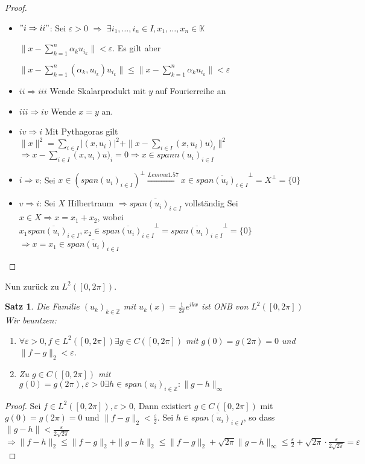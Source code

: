 \documentclass[ngerman]{report}
\theoremstyle{plain}%
\newtheorem{thm}{Satz}[chapter]
\theoremstyle{definition}%
\theoremstyle{myStyle}
\newcommand{\Z}{\mathbb{Z}}
\newcommand{\K}{\mathbb{K}}
\newcommand{\norm}[1]{\|#1\|}
\newcommand{\df}[1][]{%
	\overset{#1}{\Rightarrow}
}
\newcommand{\qmarks}[1]{"#1"}
\newcommand{\ff}[3]{(#1_#2)_{#2\in#3}}
\begin{document}
	\begin{proof}
		\begin{itemize}[]
			\item $\qmarks{i\df ii}$: 
				Sei $\varepsilon > 0$ $\df$ $\exists i_1,\dots,i_n \in I, x_1,\dots,x_n \in \K$\par
					$\norm{x - \sum_{k=1}^n\alpha_k u_{i_k}} < \varepsilon$. Es gilt aber \par
					$\norm{x - \sum_{k=1}^n(\alpha_k ,u_{i_k})u_{i_k}} \leq \norm{x - \sum_{k=1}^n\alpha_k u_{i_k}} < \varepsilon$
			\item $ii\df iii$ Wende Skalarprodukt mit $y$ auf Fourierreihe an
			\item $iii \df iv$ Wende $x=y$ an.
			\item $iv \df i$ Mit Pythagoras gilt 
			 $\norm{x}^2 = \sum_{i\in I}|(x,u_i)|^2 + \norm{x - \sum_{i\in I}(x,u_i) u)_i}^2$
			 $\df x - \sum_{i\in I}(x,u_i) u)_i = 0 \df x\in spann\ff{u}{i}{I}$
			\item $i\df v$: Sei $x\in(span\ff{u}{i}{I})^\perp \df[Lemma 1.57] x\in \overline{span\ff{u}{i}{I}}^\perp = X^\perp = \{0\}$
			\item $v \df i$: Sei $X$ Hilbertraum $\df \overline{span\ff{u}{i}{I}}$ vollständig
			Sei $x\in X \df x = x_1 + x_2$, wobei 
			$x_1 \overline{span\ff{u}{i}{I}}, x_2 \in \overline{span\ff{u}{i}{I}}^\perp = \overline{span\ff{u}{i}{I}}^\perp = \{0\}$
			$\df x = x_1 \in \overline{span\ff{u}{i}{I}}$
		\end{itemize}
	\end{proof}

	Nun zurück zu $L^2([0,2\pi]).$

	\begin{thm} 
		Die Familie $\ff{u}{k}{\Z}$ mit $u_k(x) = \frac{1}{2 \pi} e^{ikx}$ ist ONB von $L^2([0,2\pi])$ 
		Wir beuntzen:	 
			\begin{enumerate}
				\item $\forall \varepsilon > 0, f\in L^2([0,2\pi]) \exists g\in C([0,2\pi])$ mit 
				$g(0) = g(2\pi) = 0$ und $\norm{f-g}_2 < \varepsilon$.
				\item Zu $g\in C([0,2\pi])$ mit $g(0) = g(2\pi), \varepsilon > 0 \exists h\in span\ff{u}{i}{\Z}: \norm{g-h}_\infty$
			\end{enumerate}
	\end{thm}
	\begin{proof}
		Sei $f\in L^2([0,2\pi]), \varepsilon > 0$,
		Dann existiert $g\in C([0,2\pi])$ mit $g(0) = g(2\pi) = 0$ und $\norm{f-g}_2 < \frac{\varepsilon}{2}$.
		Sei $h\in \overline{span\ff{u}{i}{I}}$, so dass $\norm{g-h} < \frac{\varepsilon}{2\sqrt{2\pi}}$
		$\df \norm{f-h}_2 \leq \norm{f-g}_2 + \norm{g-h}_2 \leq \norm{f-g}_2 + \sqrt{2\pi} \norm{g-h}_\infty \leq \frac{\varepsilon}{2} + \sqrt{2\pi} \cdot \frac{\varepsilon}{2\sqrt{2\pi}} = \varepsilon$
	\end{proof}
\end{document}
